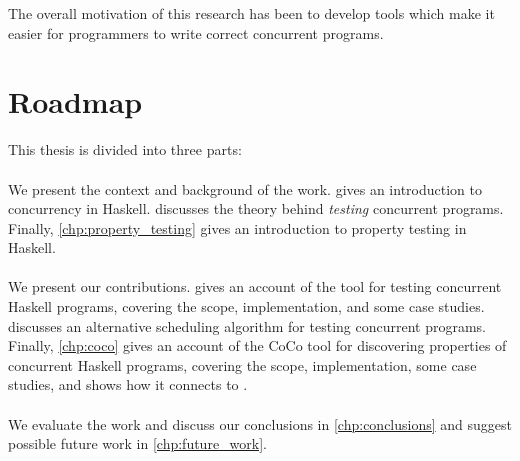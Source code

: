 The overall motivation of this research has been to develop tools
which make it easier for programmers to write correct concurrent
programs.

\section{Roadmap}
\label{sec:intro-roadmap}

This thesis is divided into three parts:

\paragraph{}
We present the context and background of the work.
 gives an introduction to concurrency in
Haskell.   discusses the theory behind \emph{testing}
concurrent programs.  Finally, \cref{chp:property_testing} gives an
introduction to property testing in Haskell.

\paragraph{}
We present our contributions.   gives an account of
the \dejafu{} tool for testing concurrent Haskell programs, covering
the scope, implementation, and some case studies.
 discusses an alternative scheduling algorithm
for testing concurrent programs.  Finally, \cref{chp:coco} gives an
account of the CoCo tool for discovering properties of concurrent
Haskell programs, covering the scope, implementation, some case
studies, and shows how it connects to \dejafu{}.

\paragraph{}
We evaluate the work and discuss our conclusions in
\cref{chp:conclusions} and suggest possible future work in
\cref{chp:future_work}.

